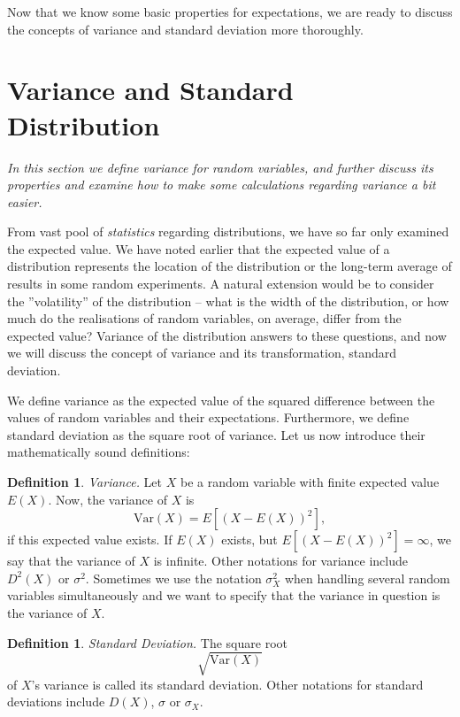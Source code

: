 \documentclass[12pt,a4paper,leqno]{report}
\newcommand{\var}{\mathrm{Var}}
\theoremstyle{plain}
\theoremstyle{definition}
\newtheorem{maar}[equation]{Definition}
\begin{document}
Now that we know some basic properties for expectations, we are ready to discuss the concepts of variance and standard deviation more thoroughly.

\section{Variance and Standard Distribution}

\emph{In this section we define variance for random variables, and further discuss its properties and examine how to make some calculations regarding variance a bit easier.}

From vast pool of \emph{statistics} regarding distributions, we have so far only examined the expected value. We have noted earlier that the expected value of a distribution represents the location of the distribution or the long-term average of results in some random experiments. A natural extension would be to consider the ''volatility'' of the distribution -- what is the width of the distribution, or how much do the realisations of random variables, on average, differ from the expected value? Variance of the distribution answers to these questions, and now we will discuss the concept of variance and its transformation, standard deviation. 

We define variance as the expected value of the squared difference between the values of random variables and their expectations. Furthermore, we define standard deviation as the square root of variance. Let us now introduce their mathematically sound definitions:

\begin{maar} \label{maar:variance}
\emph{Variance.}   Let $X$ be a random variable with finite expected value $E(X)$. Now, the variance of $X$ is 
\[
\var (X) = E\left[(X - E(X))^2\right],
\]
if this expected value exists. If $E(X)$ exists, but $E\left[(X - E(X))^2\right] = \infty$, we say that the variance of $X$ is infinite. Other notations for variance include $D^2(X)$ or $\sigma^2$. Sometimes we use the notation $\sigma^2_X$ when handling several random variables simultaneously and we want to specify that the variance in question is the variance of $X$.
\end{maar}

\begin{maar}
\emph{Standard Deviation.} The square root    
\[
\sqrt{\var(X)}
\]
of $X$'s variance is called its standard deviation. Other notations for standard deviations include $D(X)$, $\sigma$ or $\sigma_X$.
\end{maar}
\end{document}
